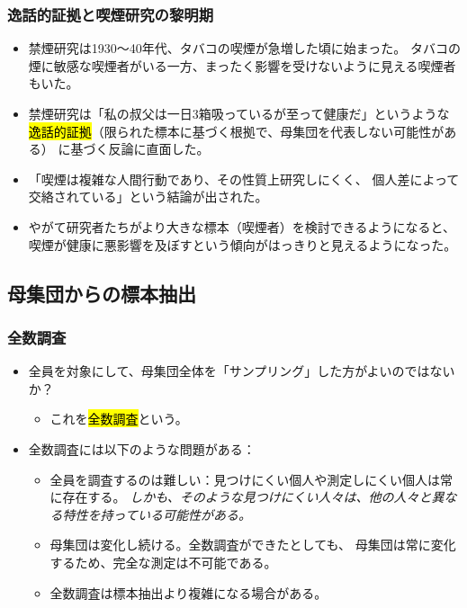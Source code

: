 \begin{frame}
\frametitle{逸話的証拠と喫煙研究の黎明期}

\begin{itemize}

\item 禁煙研究は1930〜40年代、タバコの喫煙が急増した頃に始まった。
タバコの煙に敏感な喫煙者がいる一方、まったく影響を受けないように見える喫煙者もいた。

\item 禁煙研究は「私の叔父は一日3箱吸っているが至って健康だ」というような
\hl{逸話的証拠}（限られた標本に基づく根拠で、母集団を代表しない可能性がある）
に基づく反論に直面した。

\item 「喫煙は複雑な人間行動であり、その性質上研究しにくく、
個人差によって交絡されている」という結論が出された。

\item やがて研究者たちがより大きな標本（喫煙者）を検討できるようになると、
喫煙が健康に悪影響を及ぼすという傾向がはっきりと見えるようになった。

\end{itemize}


\end{frame}


\subsection{母集団からの標本抽出}


\begin{frame}
\frametitle{全数調査}

\begin{itemize}

\item 全員を対象にして、母集団全体を「サンプリング」した方がよいのではないか？
\begin{itemize}
\item これを\hl{全数調査}という。
\end{itemize}

\item 全数調査には以下のような問題がある：

\begin{itemize}
\item 全員を調査するのは難しい：見つけにくい個人や測定しにくい個人は常に存在する。
\textit{しかも、そのような見つけにくい人々は、他の人々と異なる特性を持っている可能性がある。}
\item 母集団は変化し続ける。全数調査ができたとしても、
母集団は常に変化するため、完全な測定は不可能である。
\item 全数調査は標本抽出より複雑になる場合がある。
\end{itemize}

\end{itemize}

\end{frame}

